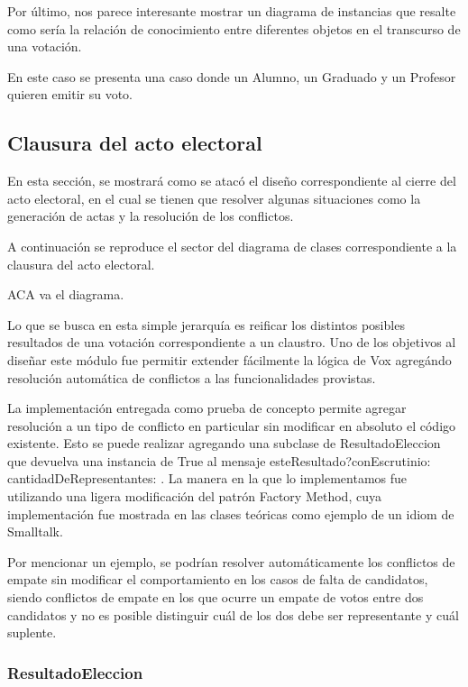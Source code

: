 Por \'ultimo, nos parece interesante mostrar un diagrama de instancias que resalte como ser\'ia la relaci\'on de conocimiento entre diferentes objetos en el transcurso de una votaci\'on.

En este caso se presenta una caso donde un Alumno, un Graduado y un Profesor quieren emitir su voto.




\subsection{Clausura del acto electoral}

En esta secci\'on, se mostrar\'a como se atac\'o el diseño correspondiente al cierre del acto electoral, en el cual se tienen que resolver algunas situaciones como la generaci\'on de actas y la resoluci\'on de los conflictos.

A continuaci\'on se reproduce el sector del diagrama de clases correspondiente a la clausura del acto electoral.


ACA va el diagrama.



Lo que se busca en esta simple jerarquía es reificar los distintos posibles resultados de una votación correspondiente a un claustro. Uno de los objetivos al diseñar este módulo fue permitir extender fácilmente la lógica de Vox agregándo resolución automática de conflictos a las funcionalidades provistas.

La implementación entregada como prueba de concepto permite agregar resolución a un tipo de conflicto en particular sin modificar en absoluto el código existente. Esto se puede realizar agregando una subclase de ResultadoEleccion que devuelva una instancia de True al mensaje esteResultado?conEscrutinio: cantidadDeRepresentantes: . La manera en la que lo implementamos fue utilizando una ligera modificación del patrón Factory Method, cuya implementación fue mostrada en las clases teóricas como ejemplo de un idiom de Smalltalk. 

Por mencionar un ejemplo, se podrían resolver automáticamente los conflictos de empate sin modificar el comportamiento en los casos de falta de candidatos, siendo conflictos de empate en los que ocurre un empate de votos entre dos candidatos y no es posible distinguir cuál de los dos debe ser representante y cuál suplente.

\subsubsection{ResultadoEleccion}


